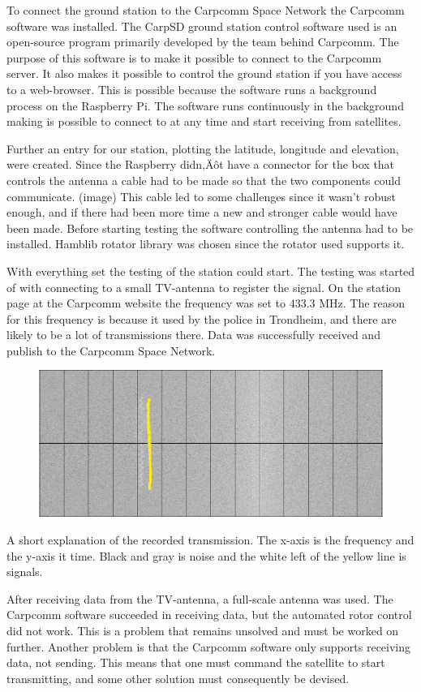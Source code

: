 To connect the ground station to the Carpcomm Space Network the Carpcomm software was installed. The CarpSD ground station control software used is an open-source program primarily developed by the team behind Carpcomm. The purpose of this software is to make it possible to connect to the Carpcomm server. It also makes it possible to control the ground station if you have access to a web-browser. This is possible because the software runs a background process on the Raspberry Pi. The software runs continuously in the background making is possible to connect to at any time and start receiving from satellites.

Further an entry for our station, plotting the latitude, longitude and elevation, were created. 
Since the Raspberry didn‚Äôt have a connector for the box that controls the antenna a cable had to be made so that the two components could communicate. (image) 
This cable led to some challenges since it wasn't robust enough, and if there had been more time a new and stronger cable would have been made. Before starting testing the software controlling the antenna had to be installed. Hamblib rotator library was chosen since the rotator used supports it. 

With everything set the testing of the station could start. The testing was started of with connecting to a small TV-antenna to register the signal. On the station page at the Carpcomm website the frequency was set to 433.3 MHz. The reason for this frequency is because it used by the police in Trondheim, and there are likely to be a lot of transmissions there. Data was successfully received and publish to the Carpcomm Space Network.

\begin{figure}
	\centering
	\includegraphics[width=\textwidth]{Figures/sattelite_transmition}
	\label{fig: Transmission}
\end{figure}
A short explanation of the recorded transmission. The x-axis is the frequency and the y-axis it time. Black and gray is noise and the white left of the yellow line is signals.

After receiving data from the TV-antenna, a full-scale antenna was used. The Carpcomm software succeeded in receiving data, but the automated rotor control did not work. This is a problem that remains unsolved and must be worked on further. Another problem is that the Carpcomm software only supports receiving data, not sending. This means that one must command the satellite to start transmitting, and some other solution must consequently be devised. 


